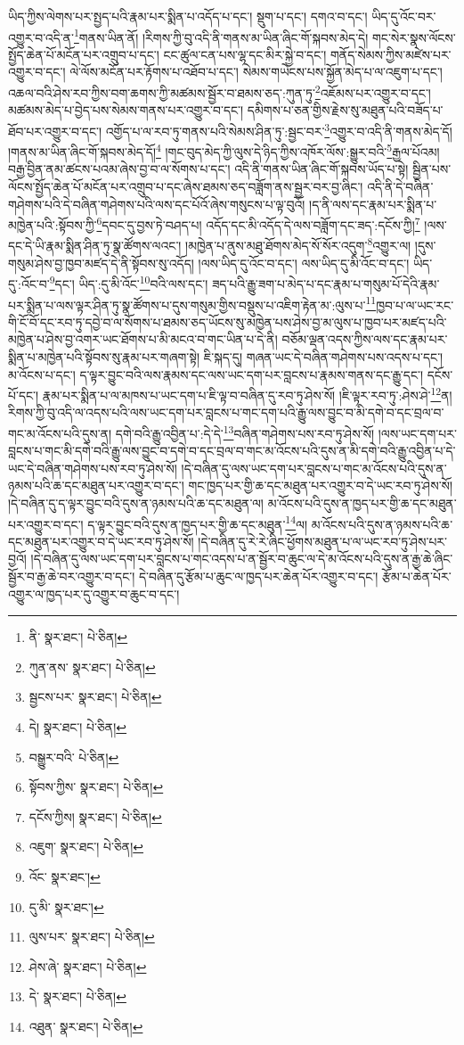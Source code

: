 ཡིད་ཀྱིས་ལེགས་པར་སྤྱད་པའི་རྣམ་པར་སྨིན་པ་འདོད་པ་དང་། སྡུག་པ་དང་། དགའ་བ་དང་། ཡིད་དུ་འོང་བར་འགྱུར་བ་འདི་ན་\footnote{ནི་  སྣར་ཐང་།  པེ་ཅིན། }གནས་ཡིན་ནོ། །རིགས་ཀྱི་བུ་འདི་ནི་གནས་མ་ཡིན་ཞིང་གོ་སྐབས་མེད་དེ། གང་སེར་སྣས་ལོངས་སྤྱོད་ཆེན་པོ་མངོན་པར་འགྲུབ་པ་དང་། ངང་ཚུལ་ངན་པས་ལྷ་དང་མིར་སྐྱེ་བ་དང་། གནོད་སེམས་ཀྱིས་མཛེས་པར་འགྱུར་བ་དང་། ལེ་ལོས་མངོན་པར་རྟོགས་པ་འཐོབ་པ་དང་། སེམས་གཡེངས་པས་སྐྱོན་མེད་པ་ལ་འཇུག་པ་དང་། འཆལ་བའི་ཤེས་རབ་ཀྱིས་བག་ཆགས་ཀྱི་མཚམས་སྦྱོར་བ་ཐམས་ཅད་:ཀུན་ཏུ་\footnote{ཀུན་ནས་  སྣར་ཐང་།  པེ་ཅིན། }འཇོམས་པར་འགྱུར་བ་དང་། མཚམས་མེད་པ་བྱེད་པས་སེམས་གནས་པར་འགྱུར་བ་དང་། དམིགས་པ་ཅན་གྱིས་རྗེས་སུ་མཐུན་པའི་བཟོད་པ་ཐོབ་པར་འགྱུར་བ་དང་། འགྱོད་པ་ལ་རབ་ཏུ་གནས་པའི་སེམས་ཤིན་ཏུ་:སྦྱང་བར་\footnote{སྦྱངས་པར་  སྣར་ཐང་།  པེ་ཅིན། }འགྱུར་བ་འདི་ནི་གནས་མེད་དོ། །གནས་མ་ཡིན་ཞིང་གོ་སྐབས་མེད་དོ།\footnote{དེ།  སྣར་ཐང་།  པེ་ཅིན། } །གང་བུད་མེད་ཀྱི་ལུས་དེ་ཉིད་ཀྱིས་འཁོར་ལོས་:སྒྱུར་བའི་\footnote{བསྒྱུར་བའི་  པེ་ཅིན། }རྒྱལ་པོའམ། བརྒྱ་བྱིན་ནམ་ཚངས་པའམ་ཞེས་བྱ་བ་ལ་སོགས་པ་དང་། འདི་ནི་གནས་ཡིན་ཞིང་གོ་སྐབས་ཡོད་པ་སྟེ། སྦྱིན་པས་ལོངས་སྤྱོད་ཆེན་པོ་མངོན་པར་འགྲུབ་པ་དང་ཞེས་ཐམས་ཅད་བཟློག་ནས་སྦྱར་བར་བྱ་ཞིང་། འདི་ནི་དེ་བཞིན་གཤེགས་པའི་དེ་བཞིན་གཤེགས་པའི་ལས་དང་པོའོ་ཞེས་གསུངས་པ་ལྟ་བུའོ། །ད་ནི་ལས་དང་རྣམ་པར་སྨིན་པ་མཁྱེན་པའི་:སྟོབས་ཀྱི་\footnote{སྟོབས་ཀྱིས་  སྣར་ཐང་།  པེ་ཅིན། }དབང་དུ་བྱས་ཏེ་བཤད་པ། འདོད་དང་མི་འདོད་དེ་ལས་བཟློག་དང་ཟད་:དངོས་ཀྱི།\footnote{དངོས་ཀྱིས།  སྣར་ཐང་།  པེ་ཅིན། } །ལས་དང་དེ་ཡི་རྣམ་སྨིན་ཤིན་ཏུ་སྣ་ཚོགས་ལའང་། །མཁྱེན་པ་ནུས་མཐུ་ཐོགས་མེད་སོ་སོར་འདུག་\footnote{འཇུག་  སྣར་ཐང་།  པེ་ཅིན། }འགྱུར་ལ། །དུས་གསུམ་ཤེས་བྱ་ཁྱབ་མཛད་དེ་ནི་སྟོབས་སུ་འདོད། །ལས་ཡིད་དུ་འོང་བ་དང་། ལས་ཡིད་དུ་མི་འོང་བ་དང་། ཡིད་དུ་:འོང་བ་\footnote{འོང་  སྣར་ཐང་། }དང་། ཡིད་:དུ་མི་འོང་\footnote{དུ་མི་  སྣར་ཐང་། }བའི་ལས་དང་། ཟད་པའི་རྒྱུ་ཟག་པ་མེད་པ་དང་རྣམ་པ་གསུམ་པོ་དེའི་རྣམ་པར་སྨིན་པ་ལས་ལྟར་ཤིན་ཏུ་སྣ་ཚོགས་པ་དུས་གསུམ་གྱིས་བསྡུས་པ་འཇིག་རྟེན་མ་:ལུས་པ་\footnote{ལུས་པར་  སྣར་ཐང་།  པེ་ཅིན། }ཁྱབ་པ་ལ་ཡང་རང་གི་ངོ་བོ་དང་རབ་ཏུ་དབྱེ་བ་ལ་སོགས་པ་ཐམས་ཅད་ཡོངས་སུ་མཁྱེན་པས་ཤེས་བྱ་མ་ལུས་པ་ཁྱབ་པར་མཛད་པའི་མཁྱེན་པ་ཤེས་བྱ་འགར་ཡང་ཐོགས་པ་མི་མངའ་བ་གང་ཡིན་པ་དེ་ནི། བཅོམ་ལྡན་འདས་ཀྱིས་ལས་དང་རྣམ་པར་སྨིན་པ་མཁྱེན་པའི་སྟོབས་སུ་རྣམ་པར་གཞག་སྟེ། ཇི་སྐད་དུ། གཞན་ཡང་དེ་བཞིན་གཤེགས་པས་འདས་པ་དང་། མ་འོངས་པ་དང་། ད་ལྟར་བྱུང་བའི་ལས་རྣམས་དང་ལས་ཡང་དག་པར་བླངས་པ་རྣམས་གནས་དང་རྒྱུ་དང་། དངོས་པོ་དང་། རྣམ་པར་སྨིན་པ་ལ་མཁས་པ་ཡང་དག་པ་ཇི་ལྟ་བ་བཞིན་དུ་རབ་ཏུ་ཤེས་སོ། །ཇི་ལྟར་རབ་ཏུ་:ཤེས་ཤེ་\footnote{ཤེས་ཞེ་  སྣར་ཐང་།  པེ་ཅིན། }ན། རིགས་ཀྱི་བུ་འདི་ལ་འདས་པའི་ལས་ཡང་དག་པར་བླངས་པ་གང་དག་པའི་རྒྱུ་ལས་བྱུང་བ་མི་དགེ་བ་དང་བྲལ་བ་གང་མ་འོངས་པའི་དུས་ན། དགེ་བའི་རྒྱུ་འབྱིན་པ་:དེ་དེ་\footnote{དེ་  སྣར་ཐང་།  པེ་ཅིན། }བཞིན་གཤེགས་པས་རབ་ཏུ་ཤེས་སོ། །ལས་ཡང་དག་པར་བླངས་པ་གང་མི་དགེ་བའི་རྒྱུ་ལས་བྱུང་བ་དགེ་བ་དང་བྲལ་བ་གང་མ་འོངས་པའི་དུས་ན་མི་དགེ་བའི་རྒྱུ་འབྱིན་པ་དེ་ཡང་དེ་བཞིན་གཤེགས་པས་རབ་ཏུ་ཤེས་སོ། །དེ་བཞིན་དུ་ལས་ཡང་དག་པར་བླངས་པ་གང་མ་འོངས་པའི་དུས་ན་ཉམས་པའི་ཆ་དང་མཐུན་པར་འགྱུར་བ་དང་། གང་ཁྱད་པར་གྱི་ཆ་དང་མཐུན་པར་འགྱུར་བ་དེ་ཡང་རབ་ཏུ་ཤེས་སོ། །དེ་བཞིན་དུ་ད་ལྟར་བྱུང་བའི་དུས་ན་ཉམས་པའི་ཆ་དང་མཐུན་ལ། མ་འོངས་པའི་དུས་ན་ཁྱད་པར་གྱི་ཆ་དང་མཐུན་པར་འགྱུར་བ་དང་། ད་ལྟར་བྱུང་བའི་དུས་ན་ཁྱད་པར་གྱི་ཆ་དང་མཐུན་\footnote{འཐུན་  སྣར་ཐང་།  པེ་ཅིན། }ལ། མ་འོངས་པའི་དུས་ན་ཉམས་པའི་ཆ་དང་མཐུན་པར་འགྱུར་བ་དེ་ཡང་རབ་ཏུ་ཤེས་སོ། །དེ་བཞིན་དུ་རེ་རེ་ཞིང་ཕྱོགས་མཐུན་པ་ལ་ཡང་རབ་ཏུ་ཤེས་པར་བྱའོ། །དེ་བཞིན་དུ་ལས་ཡང་དག་པར་བླངས་པ་གང་འདས་པ་ན་སྦྱོར་བ་ཆུང་ལ་དེ་མ་འོངས་པའི་དུས་ན་རྒྱ་ཆེ་ཞིང་སྦྱོར་བ་རྒྱ་ཆེ་བར་འགྱུར་བ་དང་། དེ་བཞིན་དུ་རྩོམ་པ་ཆུང་ལ་ཁྱད་པར་ཆེན་པོར་འགྱུར་བ་དང་། རྩོམ་པ་ཆེན་པོར་འགྱུར་ལ་ཁྱད་པར་དུ་འགྱུར་བ་ཆུང་བ་དང་། 